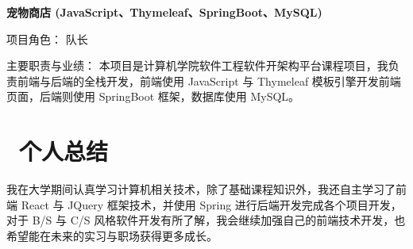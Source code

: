 \documentclass[12pt, a4paper]{article}
\begin{document}
\textbf{宠物商店 (JavaScript、Thymeleaf、SpringBoot、MySQL)}

项目角色： 队长

主要职责与业绩： 本项目是计算机学院软件工程软件开架构平台课程项目，我负责前端与后端的全栈开发，前端使用 JavaScript 与 Thymeleaf 模板引擎开发前端页面，后端则使用 SpringBoot 框架，数据库使用 MySQL。


\section{\color{CVBlue}\faAtlassian\ 个人总结}

我在大学期间认真学习计算机相关技术，除了基础课程知识外，我还自主学习了前端 React 与 JQuery 框架技术，并使用 Spring 进行后端开发完成各个项目开发，对于 B/S 与 C/S 风格软件开发有所了解，我会继续加强自己的前端技术开发，也希望能在未来的实习与职场获得更多成长。
\end{document}
